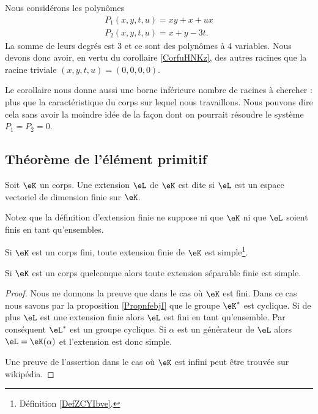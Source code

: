 \begin{example}
    Nous considérons les polynômes
    \begin{subequations}
        \begin{align}
            P_1(x,y,t,u)=xy+x+ux\\
            P_2(x,y,t,u)=x+y-3t.
        \end{align}
    \end{subequations}
    La somme de leurs degrés est \( 3\) et ce sont des polynômes à \( 4\) variables. Nous devons donc avoir, en vertu du corollaire \ref{CorfuHNKz}, des autres racines que la racine triviale \( (x,y,t,u)=(0,0,0,0)\).

    Le corollaire nous donne aussi une borne inférieure nombre de racines à chercher : plus que la caractéristique du corps sur lequel nous travaillons. Nous pouvons dire cela sans avoir la moindre idée de la façon dont on pourrait résoudre le système \( P_1=P_2=0\).
\end{example}

\subsection{Théorème de l'élément primitif}

\begin{definition}
    Soit \( \eK\) un corps. Une extension \( \eL\) de \( \eK\) est dite  si \( \eL\) est un espace vectoriel de dimension finie sur \( \eK\).
\end{definition}
Notez que la définition d'extension finie ne suppose ni que \( \eK\) ni que \( \eL\) soient finis en tant qu'ensembles.

\begin{theorem}
    Si \( \eK\) est un corps fini, toute extension finie de \( \eK\) est simple\footnote{Définition \ref{DefZCYIbve}.}.

    Si \( \eK\) est un corps quelconque alors toute extension séparable finie est simple.
\end{theorem}

\begin{proof}
    Nous ne donnons la preuve que dans le cas où \( \eK\) est fini. Dans ce cas nous savons par la proposition \ref{PropnfebjI} que le groupe \( \eK^*\) est cyclique. Si de plus \( \eL\) est une extension finie alors \( \eL\) est fini en tant qu'ensemble. Par conséquent \( \eL^*\) est un groupe cyclique. Si \( \alpha\) est un générateur de \( \eL\) alors \( \eL=\eK(\alpha)\) et l'extension est donc simple.

    Une preuve de l'assertion dans le cas où \( \eK\) est infini peut être trouvée sur wikipédia.
\end{proof}

